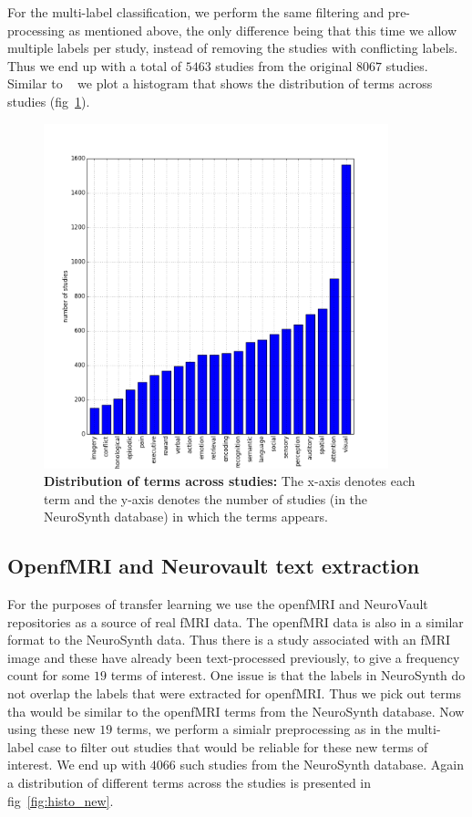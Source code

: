 \documentclass{article} %
\begin{document}
For the multi-label classification, we perform the same filtering and pre-processing as mentioned above, the only difference being that this time we allow multiple labels per study, instead of removing the studies with conflicting labels. Thus we end up with a total of $5463$ studies from the original $8067$ studies. Similar to ~\cite{sanmi2013multi} we plot a histogram that shows the distribution of terms across studies (fig~\ref{fig:histo_old}). 

\begin{figure}[h]
\begin{center}
\includegraphics[height=10cm, width=10cm]{histo_old.png}
\end{center}
\caption{\textbf{Distribution of terms across studies:} The x-axis denotes each term and the y-axis denotes the number of studies (in the NeuroSynth database) in which the terms appears.}
\label{fig:histo_old}
\end{figure}

\subsection{OpenfMRI and Neurovault text extraction}

For the purposes of transfer learning we use the openfMRI and NeuroVault repositories as a source of real fMRI data. The openfMRI data is also in a similar format to the NeuroSynth data.  Thus there is a study associated with an fMRI image and these have already been text-processed previously, to give a frequency count for some $19$ terms of interest.  One issue is that the labels in NeuroSynth do not overlap the labels that were extracted for openfMRI. Thus we pick out terms tha would be similar to the openfMRI terms from the NeuroSynth database. Now using these new $19$ terms, we perform a simialr preprocessing as in the multi-label case to filter out studies that would be reliable for these new terms of interest. We end up with $4066$ such studies from the NeuroSynth database. Again a distribution of different terms across the studies is presented in fig~\ref{fig:histo_new}.
\end{document}
